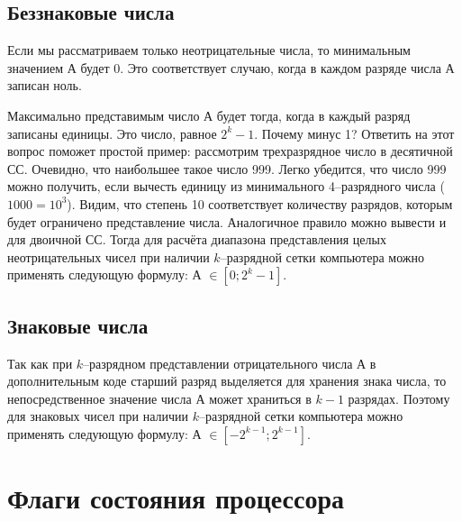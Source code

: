 \subsection{Беззнаковые числа}
Если мы рассматриваем только неотрицательные числа, то минимальным значением А будет 0. Это соответствует случаю, когда в каждом разряде числа А записан ноль.

Максимально представимым число А будет тогда, когда в каждый разряд записаны единицы. Это число, равное $2^k-1$.
Почему минус 1? Ответить на этот вопрос поможет простой пример: рассмотрим трехразрядное число в десятичной СС. Очевидно, что наибольшее такое число 999. Легко убедится, что число 999 можно получить, если вычесть единицу из минимального 4--разрядного числа ($1000 = 10^3$). Видим, что степень 10 соответствует количеству разрядов, которым будет ограничено представление числа. Аналогичное правило можно вывести и для двоичной СС. Тогда для расчёта диапазона представления целых неотрицательных чисел при наличии $k$--разрядной сетки компьютера можно применять следующую формулу: А $\in [0;2^k-1]$.

\subsection{Знаковые числа}
Так как при $k$--разрядном представлении отрицательного числа А в дополнительным коде старший разряд выделяется для хранения знака числа, то непосредственное значение числа А может храниться в $k-1$ разрядах. Поэтому для знаковых чисел при наличии $k$--разрядной сетки компьютера можно применять следующую формулу: А $\in [-2^{k-1};2^{k-1}]$.

\section{Флаги состояния процессора}

